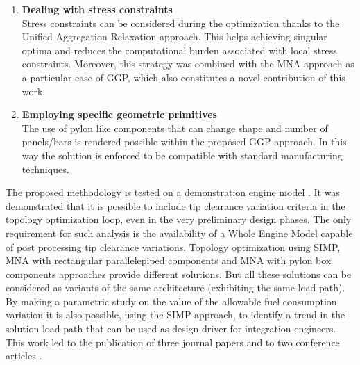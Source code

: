 \begin{enumerate}
	\item \textbf{Dealing with stress constraints}\\
	Stress constraints can be considered during the optimization thanks to the Unified Aggregation Relaxation approach. This helps achieving singular optima and reduces the computational burden associated with local stress constraints. Moreover, this strategy was combined with the MNA approach as a particular case of GGP, which also constitutes a novel contribution of this work.
	\item \textbf{Employing specific geometric primitives}\\
	The use of pylon like components that can change shape and number of panels/bars is rendered possible within the proposed GGP approach. In this way the solution is enforced to be compatible with standard manufacturing techniques. 
\end{enumerate}
The proposed methodology is tested on a demonstration engine model \cite{coniglio2019enginepylon}.
It was demonstrated that it is possible to include tip clearance variation criteria in the topology optimization loop, even in the very preliminary design phases. The only requirement for such analysis is the availability of a Whole Engine Model capable of post processing tip clearance variations.
Topology optimization using SIMP, MNA with rectangular parallelepiped components and MNA with pylon box components approaches provide different solutions. But all these solutions can be considered as variants of the same architecture (exhibiting the same load path). By making a parametric study on the value of the allowable fuel consumption variation it is also possible, using the SIMP approach, to identify a trend in the solution load path that can be used as design driver for integration engineers.
This work led to the publication of three journal papers \cite{coniglio2018weighted,coniglio2019enginepylon,coniglio2019generalized} and to two conference articles \cite{coniglio2017pylon,coniglio2018original}.
